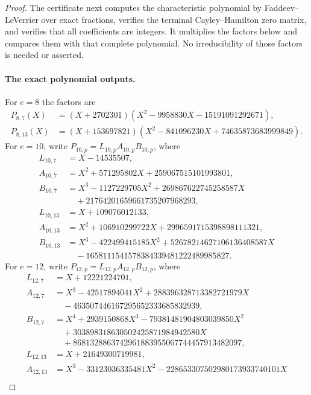 \documentclass[11pt,a4paper]{article}
\theoremstyle{definition}
\begin{document}
\begin{proof}
The certificate next computes the characteristic polynomial by
Faddeev--LeVerrier over exact fractions, verifies the terminal
Cayley--Hamilton zero matrix, and verifies that all coefficients
are integers. It multiplies the factors below and compares them
with that complete polynomial. No irreducibility of those factors
is needed or asserted.

\paragraph{The exact polynomial outputs.}
For $e=8$ the factors are
\[
\begin{aligned}
 P_{8,7}(X)&=(X+2702301)
             (X^2-9958830X-15191091292671),\\
 P_{8,13}(X)&=(X+153697821)
             (X^2-841096230X+74635873683999849).
\end{aligned}
\tag{UG.10}
\]
For $e=10$, write $P_{10,p}=L_{10,p}A_{10,p}B_{10,p}$, where
\[
\begin{aligned}
 L_{10,7}&=X-14535507,\\
 A_{10,7}&=X^2+571295802X+259067515101993801,\\
 B_{10,7}&=X^3-1127229705X^2+269867622745258587X\\
          &\quad+21764201659661735207968293,\\
 L_{10,13}&=X+109076012133,\\
 A_{10,13}&=X^2+106910299722X+2996591715398898111321,\\
 B_{10,13}&=X^3-422499415185X^2+52678214627106136408587X\\
          &\quad-1658111541578384339481222489985827.
\end{aligned}
\tag{UG.11}
\]
For $e=12$, write $P_{12,p}=L_{12,p}A_{12,p}B_{12,p}$, where
\[
\begin{aligned}
 L_{12,7}&=X+12221224701,\\
 A_{12,7}&=X^3-42517894041X^2+288396328713382721979X\\
          &\quad-463507446167295652333685832939,\\
 B_{12,7}&=X^4+2939150868X^3-79381481904803039850X^2\\
          &\quad+303898318630502425871984942580X\\
          &\quad+8681328863742961883955067744457913482097,\\
 L_{12,13}&=X+21649300719981,\\
 A_{12,13}&=X^3-33123036335481X^2-228653307502980173933740101X\\

\end{aligned}\]
\end{proof}
\end{document}
